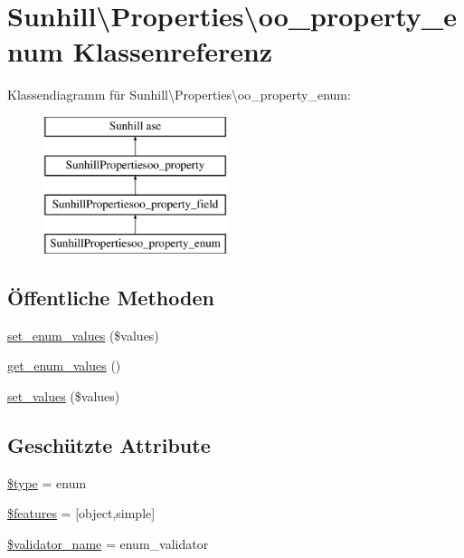 \hypertarget{classSunhill_1_1Properties_1_1oo__property__enum}{}\section{Sunhill\textbackslash{}Properties\textbackslash{}oo\+\_\+property\+\_\+enum Klassenreferenz}
\label{classSunhill_1_1Properties_1_1oo__property__enum}
Klassendiagramm für Sunhill\textbackslash{}Properties\textbackslash{}oo\+\_\+property\+\_\+enum\+:\begin{figure}[H]
\begin{center}
\leavevmode
\includegraphics[height=4.000000cm]{d0/d81/classSunhill_1_1Properties_1_1oo__property__enum}
\end{center}
\end{figure}
\subsection*{Öffentliche Methoden}
\begin{DoxyCompactItemize}
\item 
\hyperlink{classSunhill_1_1Properties_1_1oo__property__enum_a81b28016e98999329bbf8b0ff5164b4d}{set\+\_\+enum\+\_\+values} (\$values)
\item 
\hyperlink{classSunhill_1_1Properties_1_1oo__property__enum_af492420e4440b23c6a7439c688161f96}{get\+\_\+enum\+\_\+values} ()
\item 
\hyperlink{classSunhill_1_1Properties_1_1oo__property__enum_af233c82d8bd2c0b94d8964ed3df9d721}{set\+\_\+values} (\$values)
\end{DoxyCompactItemize}
\subsection*{Geschützte Attribute}
\begin{DoxyCompactItemize}
\item 
\hyperlink{classSunhill_1_1Properties_1_1oo__property__enum_a3c3f990f50ea6c81e7dd09fd902dbbbf}{\$type} = \textquotesingle{}enum\textquotesingle{}
\item 
\hyperlink{classSunhill_1_1Properties_1_1oo__property__enum_a5b88a16d43990d33ac04f639e3c3f84a}{\$features} = \mbox{[}\textquotesingle{}object\textquotesingle{},\textquotesingle{}simple\textquotesingle{}\mbox{]}
\item 
\hyperlink{classSunhill_1_1Properties_1_1oo__property__enum_a0d0b9186b1ec1ff85516ee31fab8d4e7}{\$validator\+\_\+name} = \textquotesingle{}enum\+\_\+validator\textquotesingle{}
\end{DoxyCompactItemize}
